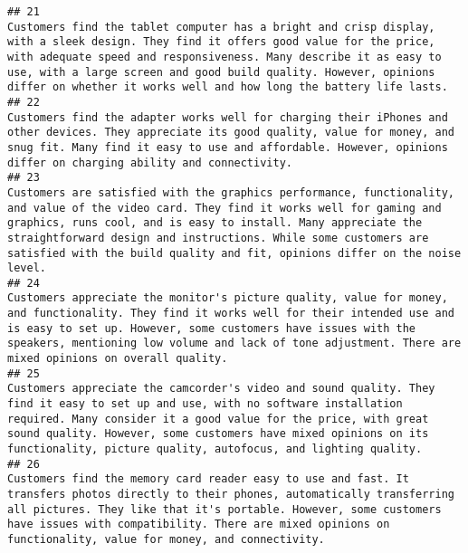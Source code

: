 \documentclass[
]{article}
\begin{document}
\begin{verbatim}
## 21                                                                                                                                      Customers find the tablet computer has a bright and crisp display, with a sleek design. They find it offers good value for the price, with adequate speed and responsiveness. Many describe it as easy to use, with a large screen and good build quality. However, opinions differ on whether it works well and how long the battery life lasts.
## 22                                                                                                                                                                                                                           Customers find the adapter works well for charging their iPhones and other devices. They appreciate its good quality, value for money, and snug fit. Many find it easy to use and affordable. However, opinions differ on charging ability and connectivity.
## 23                                                                                                                             Customers are satisfied with the graphics performance, functionality, and value of the video card. They find it works well for gaming and graphics, runs cool, and is easy to install. Many appreciate the straightforward design and instructions. While some customers are satisfied with the build quality and fit, opinions differ on the noise level.
## 24                                                                                                                                                                   Customers appreciate the monitor's picture quality, value for money, and functionality. They find it works well for their intended use and is easy to set up. However, some customers have issues with the speakers, mentioning low volume and lack of tone adjustment. There are mixed opinions on overall quality.
## 25                                                                                                                                                  Customers appreciate the camcorder's video and sound quality. They find it easy to set up and use, with no software installation required. Many consider it a good value for the price, with great sound quality. However, some customers have mixed opinions on its functionality, picture quality, autofocus, and lighting quality.
## 26                                                                                                                                                                 Customers find the memory card reader easy to use and fast. It transfers photos directly to their phones, automatically transferring all pictures. They like that it's portable. However, some customers have issues with compatibility. There are mixed opinions on functionality, value for money, and connectivity.

\end{verbatim}
\end{document}
